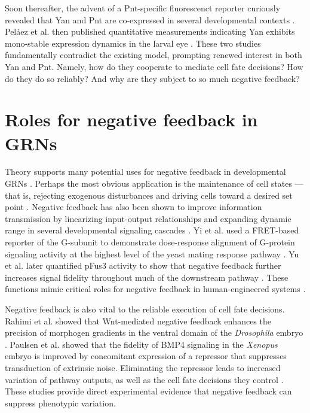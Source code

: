 Soon thereafter, the advent of a Pnt-specific fluorescenct reporter curiously revealed that Yan and Pnt are co-expressed in several developmental contexts \cite{BoisclairLachance2014}. Pel\'{a}ez et al. then published quantitative measurements indicating Yan exhibits  mono-stable expression dynamics in the larval eye \cite{Pelaez2015a}. These two studies fundamentally contradict the existing model, prompting renewed interest in both Yan and Pnt. Namely, how do they cooperate to mediate cell fate decisions? How do they do so reliably? And why are they subject to so much negative feedback?

\section{Roles for negative feedback in GRNs}
 
Theory supports many potential uses for negative feedback in developmental GRNs \cite{Freeman2000}. Perhaps the most obvious application is the maintenance of cell states --- that is, rejecting exogenous disturbances and driving cells toward a desired set point \cite{Alon2007,Behar2007,Yi2000}. Negative feedback has also been shown to improve information transmission by linearizing input-output relationships and expanding dynamic range in several developmental signaling cascades \cite{Bhalla2002,Cheong2011,Paulsen2011,Yi2003,Yu2008a}. Yi et al. used a FRET-based reporter of the G\textalpha-subunit to demonstrate dose-response alignment of G-protein signaling activity at the highest level of the yeast mating response pathway \cite{Yi2003}. Yu et al. later quantified pFus3 activity to show that negative feedback further increases signal fidelity throughout much of the downstream pathway \cite{Yu2008a}. These functions mimic critical roles for negative feedback in human-engineered systems \cite{Khammash2016}.

Negative feedback is also vital to the reliable execution of cell fate decisions. Rahimi et al. showed that Wnt-mediated negative feedback enhances the precision of morphogen gradients in the ventral domain of the \textit{Drosophila} embryo \cite{Rahimi2016}. Paulsen et al. showed that the fidelity of BMP4 signaling in the \textit{Xenopus} embryo is improved by concomitant expression of a repressor that suppresses transduction of extrinsic noise. Eliminating the repressor leads to increased variation of pathway outputs, as well as the cell fate decisions they control \cite{Paulsen2011}. These studies provide direct experimental evidence that negative feedback can suppress phenotypic variation. 

